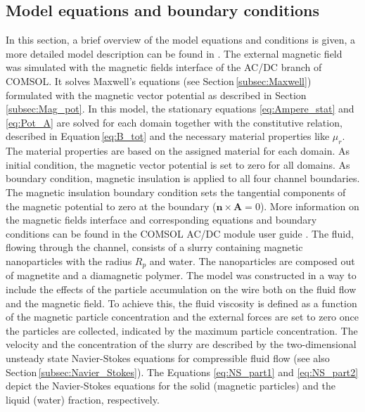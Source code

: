 \subsection{Model equations and boundary conditions}
\label{subsec:model_eq_BC}
In this section, a brief overview of the model equations and conditions is given, a more detailed model description can be found in \cite{choomphon2017simulation}. The external magnetic field was simulated with the magnetic fields interface of the AC/DC branch of COMSOL. It solves Maxwell's equations (see Section\,\ref{subsec:Maxwell}) formulated with the magnetic vector potential as described in Section\,\ref{subsec:Mag_pot}. In this model, the stationary equations \ref{eq:Ampere_stat} and \ref{eq:Pot_A} are solved for each domain together with the constitutive relation, described in Equation\,\ref{eq:B_tot} and the necessary material properties like $\mu_{r}$. The material properties are based on the assigned material for each domain. As initial condition, the magnetic vector potential is set to zero for all domains.  As boundary condition, magnetic insulation is applied to all four channel boundaries. The magnetic insulation boundary condition sets the tangential components of the magnetic potential to zero at the boundary ($\boldsymbol{n}\times\boldsymbol{A} = 0$). More information on the magnetic fields interface and corresponding equations and boundary conditions can be found in the COMSOL AC/DC module user guide \cite{ComsolACDC}. \newline
The fluid, flowing through the channel, consists of a slurry containing magnetic nanoparticles with the radius $R_{p}$ and water. The nanoparticles are composed out of magnetite and a diamagnetic polymer. The model was constructed in a way to include the effects of the particle accumulation on the wire both on the fluid flow and the magnetic field. To achieve this, the fluid viscosity is defined as a function of the magnetic particle concentration and the external forces are set to zero once the particles are collected, indicated by the maximum particle concentration. The velocity and the concentration of the slurry are described by the two-dimensional unsteady state Navier-Stokes equations for compressible fluid flow (see also Section\,\ref{subsec:Navier_Stokes}). The Equations \ref{eq:NS_part1} and \ref{eq:NS_part2} depict the Navier-Stokes equations for the solid (magnetic particles) and the liquid (water) fraction, respectively. 

